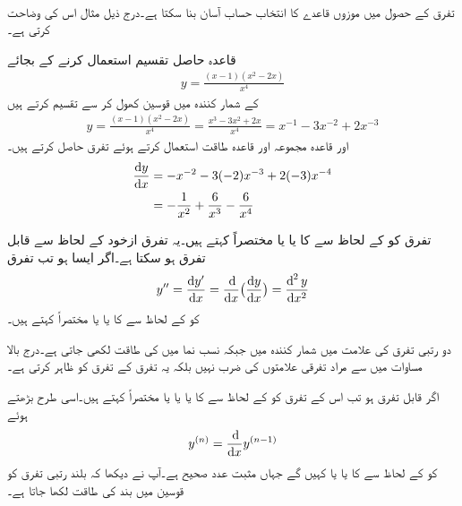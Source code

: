\\
تفرق کے حصول میں موزوں قاعدے کا انتخاب حساب آسان بنا سکتا ہے۔درج ذیل مثال اس کی وضاحت کرتی ہے۔ 

قاعدہ حاصل تقسیم استعمال کرنے کے بجائے
\begin{align*}
y=\frac{(x-1)(x^2-2x)}{x^4}
\end{align*}
کے شمار کنندہ میں قوسین کھول کر  سے تقسیم کرتے ہیں
\begin{align*}
y=\frac{(x-1)(x^2-2x)}{x^4}=\frac{x^3-3x^2+2x}{x^4}=x^{-1}-3x^{-2}+2x^{-3}
\end{align*}
اور قاعدہ مجموعہ اور قاعدہ طاقت استعمال کرتے ہوئے تفرق حاصل کرتے ہیں۔
\begin{align*}
\frac{\dif y}{\dif x}&=-x^{-2}-3(-2)x^{-3}+2(-3)x^{-4}\\
&=-\frac{1}{x^2}+\frac{6}{x^3}-\frac{6}{x^4}
\end{align*}


تفرق  کو  کے لحاظ سے  کا  یا  یا مختصراً  کہتے ہیں۔یہ تفرق ازخود  کے لحاظ سے قابل تفرق ہو سکتا ہے۔اگر ایسا ہو تب تفرق
\begin{align*}
y''=\frac{\dif y'}{\dif x}=\frac{\dif}{\dif x}\big(\frac{\dif y}{\dif x}\big)=\frac{\dif^{\,2} y}{\dif x^2}
\end{align*}
کو  کے لحاظ سے  کا  یا  یا مختصراً  کہتے ہیں۔

دو رتبی تفرق کی علامت   میں شمار کنندہ میں  جبکہ نسب نما میں  کی طاقت  لکھی جاتی ہے۔درج بالا مساوات میں  سے مراد تفرقی علامتوں کی  ضرب نہیں بلکہ یہ تفرق کے تفرق کو ظاہر کرتی ہے۔

اگر  قابل تفرق ہو تب اس کے تفرق  کو  کے لحاظ سے  کا  یا  یا  یا مختصراً  کہتے ہیں۔اسی طرح بڑھتے ہوئے
\begin{align*}
y^{(n)}=\frac{\dif}{\dif x}y^{(n-1)}
\end{align*}
کو  کے لحاظ سے  کا  یا  یا  کہیں گے جہاں  مثبت عدد صحیح ہے۔آپ نے دیکھا کہ بلند رتبی تفرق کو قوسین میں بند  کی طاقت لکھا جاتا ہے۔

